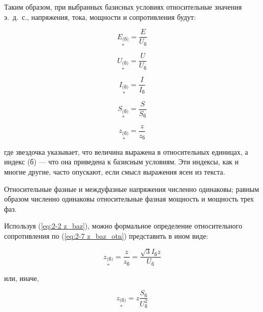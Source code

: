 Таким образом, при выбранных базисных условиях относительные значения э.~д.~с., напряжения, тока, мощности и сопротивления будут:

\begin{equation} %
	\label{eq:2-3 E_baz_otn}
	\underset{*}{E_{\text{(б)}}} = \frac{E}{U_{\text{б}}}
\end{equation}

\begin{equation} %
	\label{eq:2-4 U_baz_otn}
	\underset{*}{U_{\text{(б)}}} = \frac{U}{U_{\text{б}}}
\end{equation}

\begin{equation} %
	\label{eq:2-5 I_baz_otn}
	\underset{*}{I_{\text{(б)}}} = \frac{I}{I_{\text{б}}}
\end{equation}

\begin{equation} %
	\label{eq:2-6 S_baz_otn}
	\underset{*}{S_{\text{(б)}}} = \frac{S}{S_{\text{б}}}
\end{equation}

\begin{equation} %
	\label{eq:2-7 z_baz_otn}
	\underset{*}{z_{\text{(б)}}} = \frac{z}{z_{\text{б}}}
\end{equation}

где звездочка указывает, что величина выражена в относительных единицах, а индекс (б) --- что она приведена к базисным условиям. Эти индексы, как и многие другие, часто опускают, если смысл выражения ясен из текста.

Относительные фазные и междуфазные напряжения численно одинаковы; равным образом численно одинаковы относительные фазная мощность и мощность трех фаз.

Используя (\ref{eq:2-2 z_baz}), можно формальное определение относительного сопротивления по (\ref{eq:2-7 z_baz_otn}) представить в ином виде:

\begin{equation} %
	\label{eq:2-8 z_baz_otn 2}
	\underset{*}{z_{\text{(б)}}} = \frac{z}{z_{\text{б}}} = \frac{\sqrt{3}I_{\text{б}}z}{U_{\text{б}}}
\end{equation}

или, иначе,

\begin{equation} %
	\label{eq:2-9 z_baz_otn 3}
	\underset{*}{z_{\text{(б)}}} = z\frac{S_{\text{б}}}{U_{\text{б}}^{2}}
\end{equation}

